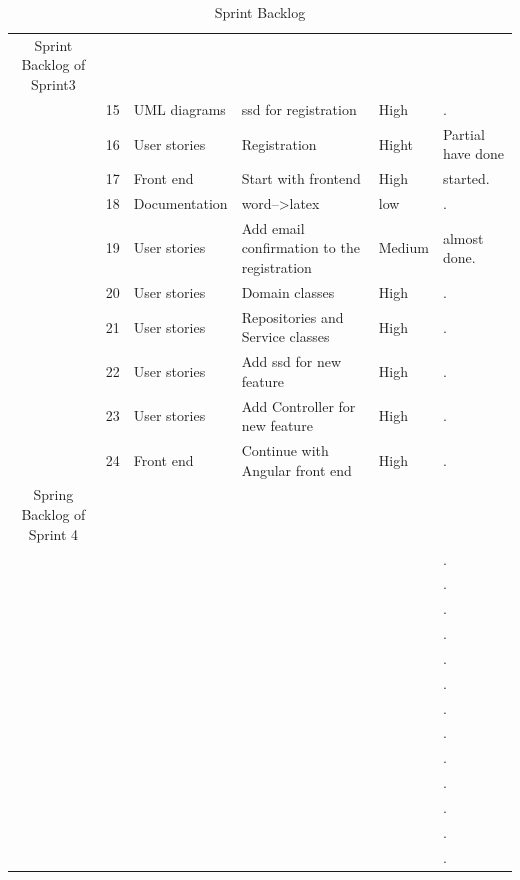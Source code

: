 \documentclass{scrartcl}
\begin{document}
\begin{table}[ht]
\begin{tabular}{c@{\qquad}lllll}
                  Sprint Backlog of Sprint3 \\
                   & 15 & UML diagrams & ssd for registration  & High & . \\ \hline
                     & 16 & User stories & Registration & Hight & Partial have done \\ \hline
                      & 17 & Front end & Start with frontend & High &   started. \\ \hline
                       & 18 & Documentation & word-->latex & low & . \\ \hline
                        & 19 & User stories & Add email confirmation to the registration & Medium & almost done. \\ \hline
                         & 20 & User stories & Domain classes & High & . \\ \hline
                          & 21 & User stories & Repositories and Service classes & High & . \\ \hline
                           & 22 & User stories & Add ssd for new feature  & High & . \\ \hline
                           & 23 & User stories &  Add Controller for new feature & High & . \\ \hline
         & 24 & Front end  & Continue with Angular front end  & High & . \\ \hline
	
	Spring Backlog of Sprint 4\\
	 &  &  &  &  & . \\ \hline
	  &  &  &  &  & . \\ \hline
	   &  &  &  &  & . \\ \hline
	    &  &  &  &  & . \\ \hline
	     &  &  &  &  & . \\ \hline
	      &  &  &  &  & . \\ \hline
	       &  &  &  &  & . \\ \hline
	        &  &  &  &  & . \\ \hline
	         &  &  &  &  & . \\ \hline
	          &  &  &  &  & . \\ \hline
	           &  &  &  &  & . \\ \hline
	            &  &  &  &  & . \\ \hline
	             &  &  &  &  & . \\ \hline
	
	 
        \midrule
    \end{tabular}
    \caption{Sprint Backlog}
    \label{tab:typo}
\end{table}
\end{document}
